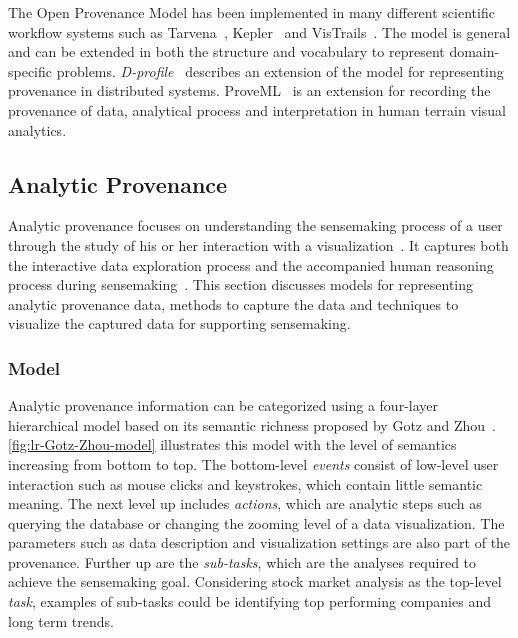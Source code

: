 The Open Provenance Model has been implemented in many different scientific workflow systems such as Tarvena~\cite{Zhao2008}, Kepler~\cite{Bowers2006} and VisTrails~\cite{Bavoil2005}. The model is general and can be extended in both the structure and vocabulary to represent domain-specific problems. \emph{D-profile}~\cite{Groth2011} describes an extension of the model for representing provenance in distributed systems. ProveML~\cite{Walker2013} is an extension for recording the provenance of data, analytical process and interpretation in human terrain visual analytics.


\subsection{Analytic Provenance}
\label{sec:lr-analytic-provenance}
Analytic provenance focuses on understanding the sensemaking process of a user through the study of his or her interaction with a visualization~\cite{North2011}. It captures both the interactive data exploration process and the accompanied human reasoning process during sensemaking~\cite{Xu2015}. This section discusses models for representing analytic provenance data, methods to capture the data and techniques to visualize the captured data for supporting sensemaking.

\subsubsection{Model}
\label{sec:lr-analytic-provenance-model}
Analytic provenance information can be categorized using a four-layer hierarchical model based on its semantic richness proposed by Gotz and Zhou~\cite{Gotz2009}. \autoref{fig:lr-Gotz-Zhou-model} illustrates this model with the level of semantics increasing from bottom to top. The bottom-level \emph{events} consist of low-level user interaction such as mouse clicks and keystrokes, which contain little semantic meaning. The next level up includes \emph{actions}, which are analytic steps such as querying the database or changing the zooming level of a data visualization. The parameters such as data description and visualization settings are also part of the provenance. Further up are the \emph{sub-tasks}, which are the analyses required to achieve the sensemaking goal. Considering stock market analysis as the top-level \emph{task}, examples of sub-tasks could be identifying top performing companies and long term trends. 

